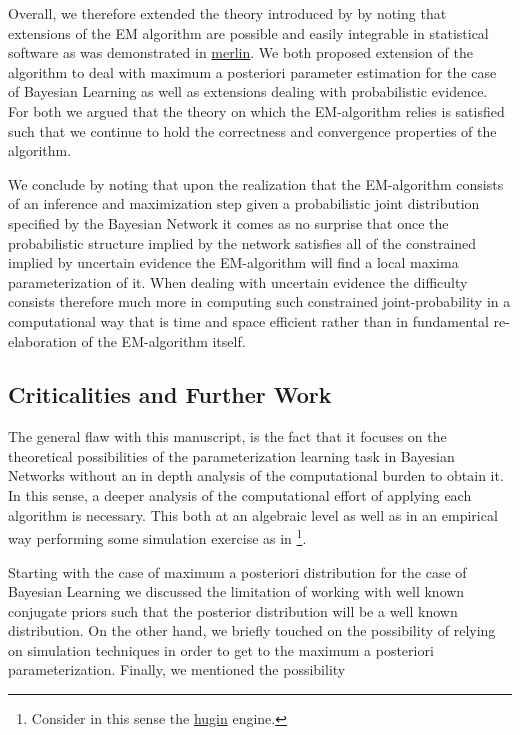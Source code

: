 \documentclass[11pt]{article}
\begin{document}
\begin{article}
Overall, we therefore extended the theory introduced by
\cite{Wasserkrug_all} by noting that extensions of the EM algorithm
are possible and easily integrable in statistical software as was
demonstrated in \href{https://github.com/radum2275/merlin}{merlin}. We both proposed extension of the algorithm
to deal with maximum a posteriori parameter estimation for the case
of Bayesian Learning as well as extensions dealing with
probabilistic evidence. For both we argued that the theory on which
the EM-algorithm relies is satisfied such that we continue to hold
the correctness and convergence properties of the algorithm.

We conclude by noting that upon the realization that the
EM-algorithm consists of an inference and maximization step given a probabilistic
joint distribution specified by the Bayesian Network it comes as no
surprise that once the probabilistic structure implied by the
network satisfies all of the constrained implied by uncertain
evidence the EM-algorithm will find a local maxima parameterization
of it. When dealing with uncertain evidence the difficulty consists
therefore much more in computing such constrained joint-probability
in a computational way that is time and space efficient rather than
in fundamental re-elaboration of the EM-algorithm itself.

\subsection{Criticalities and Further Work}
\label{sec:orge023cd1}

The general flaw with this manuscript, is the fact that it focuses
on the theoretical possibilities of the parameterization learning
task in Bayesian Networks without an in depth analysis of the
computational burden to obtain it. In this sense, a deeper analysis
of the computational effort of applying each algorithm is
necessary. This both at an algebraic level as well as in an
empirical way performing some simulation exercise as in
\cite{Wasserkrug_all}\footnote{Consider in this sense the \href{https://www.hugin.com/}{hugin} engine.}.  


Starting with the case of maximum a posteriori distribution for the
case of Bayesian Learning we discussed the limitation of working
with well known conjugate priors such that the posterior
distribution will be a well known distribution. On the other hand,
we briefly touched on the possibility of relying on simulation
techniques in order to get to the maximum a posteriori
parameterization. Finally, we mentioned the possibility 




\end{article}
\end{document}
